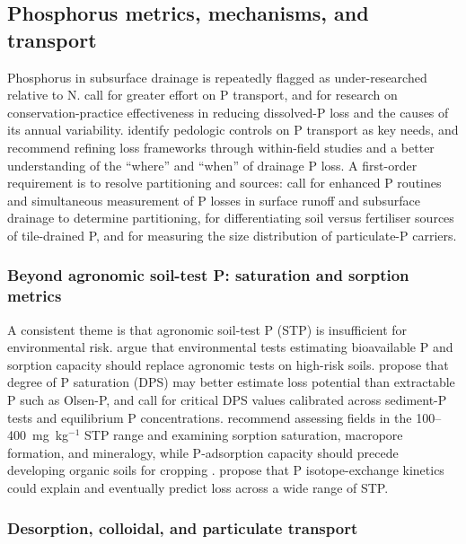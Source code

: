 \subsection{Phosphorus metrics, mechanisms, and transport}

Phosphorus in subsurface drainage is repeatedly flagged as under-researched
relative to N. \textcite{Hertzberger2019} call for greater effort on P transport,
and \textcite{Yuan2022} for research on conservation-practice effectiveness in
reducing dissolved-P loss and the causes of its annual variability.
\textcite{Pease2018} identify pedologic controls on P transport as key needs,
and \textcite{deOliveira2022} recommend refining loss frameworks through
within-field studies and a better understanding of the ``where'' and ``when'' of
drainage P loss. A first-order requirement is to resolve partitioning and
sources: \textcite{King2015} call for enhanced P routines and simultaneous
measurement of P losses in surface runoff and subsurface drainage to determine
partitioning, \textcite{Williams2016} for differentiating soil versus fertiliser
sources of tile-drained P, and \textcite{Qi2018} for measuring the size
distribution of particulate-P carriers.

\subsubsection{Beyond agronomic soil-test P: saturation and sorption metrics}

A consistent theme is that agronomic soil-test P (STP) is insufficient for
environmental risk. \textcite{Sharpley1995} argue that environmental tests
estimating bioavailable P and sorption capacity should replace agronomic tests
on high-risk soils. \textcite{Hooda1999} propose that degree of P saturation
(DPS) may better estimate loss potential than extractable P such as Olsen-P, and
\textcite{Nguyen2002} call for critical DPS values calibrated across sediment-P
tests and equilibrium P concentrations. \textcite{Osterholz2020} recommend
assessing fields in the 100--400~mg~kg$^{-1}$ STP range and examining sorption
saturation, macropore formation, and mineralogy, while P-adsorption capacity
should precede developing organic soils for cropping \parencite{MILLER1979}.
\textcite{McDowell2001} propose that P isotope-exchange kinetics could explain
and eventually predict loss across a wide range of STP.

\subsubsection{Desorption, colloidal, and particulate transport}

